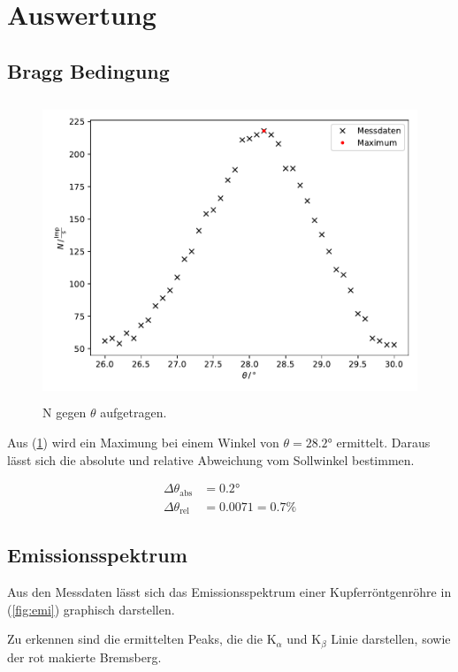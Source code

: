 \newpage
\section{Auswertung}
\subsection{Bragg Bedingung}
\label{sub:bragg}

\begin{figure}
    \centering
       \includegraphics[height=9cm]{daten/Bragg.pdf}
       \caption{N gegen $\theta$ aufgetragen.}
       \label{fig:bragg}
\end{figure}

\noindent
Aus (\ref{fig:bragg}) wird ein Maximung bei einem Winkel von $\theta=28.2°$ ermittelt.
Daraus lässt sich die absolute und relative Abweichung vom Sollwinkel bestimmen.

\begin{align*}
\Delta\theta_{\text{abs}}&=0.2°\\
\Delta\theta_{\text{rel}}&=0.0071=0.7\%
\end{align*}

\subsection{Emissionsspektrum}
\label{sub:emi}
\noindent
Aus den Messdaten lässt sich das Emissionsspektrum einer Kupferröntgenröhre in (\ref{fig:emi}) graphisch darstellen.


\noindent
Zu erkennen sind die ermittelten Peaks, die die $\text{K}_\alpha$ und $\text{K}_\beta$ Linie darstellen, sowie der rot makierte Bremsberg.

